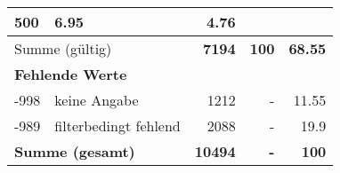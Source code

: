 \begin{longtable}{lXrrr}
       \num{500} &
       \num[round-mode=places,round-precision=2]{6.95} &
         \num[round-mode=places,round-precision=2]{4.76} \\
     \midrule
     \multicolumn{2}{l}{Summe (gültig)} &
       \textbf{\num{7194}} &
     \textbf{\num{100}} &
       \textbf{\num[round-mode=places,round-precision=2]{68.55}} \\
     \multicolumn{5}{l}{\textbf{Fehlende Werte}}\\
       -998 &
       keine Angabe &
         \num{1212} &
        - &
         \num[round-mode=places,round-precision=2]{11.55} \\
       -989 &
       filterbedingt fehlend &
         \num{2088} &
        - &
         \num[round-mode=places,round-precision=2]{19.9} \\
     \midrule
     \multicolumn{2}{l}{\textbf{Summe (gesamt)}} &
          \textbf{\num{10494}} &
        \textbf{-} &
        \textbf{\num{100}} \\
     \bottomrule
     \end{longtable}
     
